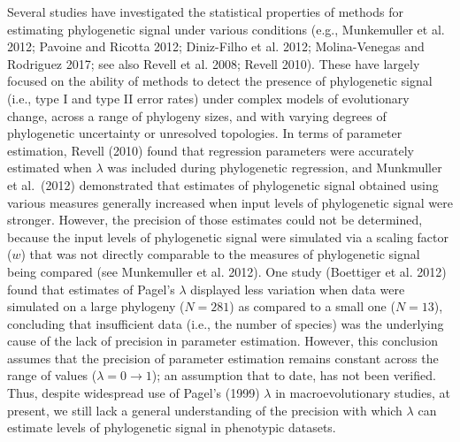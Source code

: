 \documentclass[
]{article}
\begin{document}
Several studies have investigated the statistical properties of methods
for estimating phylogenetic signal under various conditions (e.g.,
Munkemuller et al. 2012; Pavoine and Ricotta 2012; Diniz-Filho et al.
2012; Molina-Venegas and Rodriguez 2017; see also Revell et al. 2008;
Revell 2010). These have largely focused on the ability of methods to
detect the presence of phylogenetic signal (i.e., type I and type II
error rates) under complex models of evolutionary change, across a range
of phylogeny sizes, and with varying degrees of phylogenetic uncertainty
or unresolved topologies. In terms of parameter estimation, Revell
(2010) found that regression parameters were accurately estimated when
\(\lambda\) was included during phylogenetic regression, and Munkmuller
et al.~(2012) demonstrated that estimates of phylogenetic signal
obtained using various measures generally increased when input levels of
phylogenetic signal were stronger. However, the precision of those
estimates could not be determined, because the input levels of
phylogenetic signal were simulated via a scaling factor (\(w\)) that was
not directly comparable to the measures of phylogenetic signal being
compared (see Munkemuller et al. 2012). One study (Boettiger et al.
2012) found that estimates of Pagel's \(\lambda\) displayed less
variation when data were simulated on a large phylogeny (\(N=281\)) as
compared to a small one (\(N=13\)), concluding that insufficient data
(i.e., the number of species) was the underlying cause of the lack of
precision in parameter estimation. However, this conclusion assumes that
the precision of parameter estimation remains constant across the range
of values (\(\lambda = 0 \to 1\)); an assumption that to date, has not
been verified. Thus, despite widespread use of Pagel's (1999)
\(\lambda\) in macroevolutionary studies, at present, we still lack a
general understanding of the precision with which \(\lambda\) can
estimate levels of phylogenetic signal in phenotypic datasets.
\hfill\break
\end{document}
